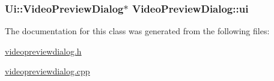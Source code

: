 \hypertarget{class_video_preview_dialog_30b98e0a21017be6e6289d94b6504cfa}{
\subsubsection[{ui}]{\setlength{\rightskip}{0pt plus 5cm}Ui::VideoPreviewDialog$\ast$ {\bf VideoPreviewDialog::ui}}}
\label{class_video_preview_dialog_30b98e0a21017be6e6289d94b6504cfa}




The documentation for this class was generated from the following files:\begin{CompactItemize}
\item 
\hyperlink{videopreviewdialog_8h}{videopreviewdialog.h}\item 
\hyperlink{videopreviewdialog_8cpp}{videopreviewdialog.cpp}\end{CompactItemize}
